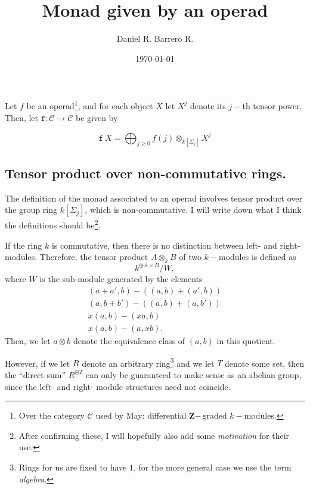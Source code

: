 \documentclass{amsart}
\title{Monad given by an operad}
\author{Daniel R. Barrero R.}
\date{\today}
\begin{document}
\maketitle

\section{}

Let $f$ be an operad\footnote{Over the category $\mathcal{C}$ used by May: differential
$\mathbf{Z}-$graded $k-$modules.}, and for each object $X$ let $X^j$ denote its $j-$th tensor
power. Then, let $\mathtt{f} : \mathcal{C} \to \mathcal{C}$ be given by

$$
\mathtt{f}\ X = \bigoplus_{j \geq 0} f(j) \otimes_{k[\Sigma_j]} X^j
$$

\subsection{Tensor product over non-commutative rings.} The definition of the monad associated to
an operad involves tensor product over the group ring $k[\Sigma_j]$, which is non-commutative.
I will write down what I think the definitions should be\footnote{After confirming these, I will
hopefully also add some \emph{motivation} for their use.}.

\begin{defn}
	If the ring $k$ is commutative, then there is no distinction between left- and right-
	modules. Therefore, the tensor product $A \otimes_k B$ of two $k-$modules is defined as
	$$
	k^{\oplus A \times B}/W,
	$$
	where $W$ is the sub-module generated by the elements
	\begin{eqnarray*}
		(a+a', b) - \left( (a, b) + (a', b) \right) \\
		(a, b+b') - \left( (a, b) + (a, b') \right) \\
		x(a, b) - (xa, b) \\
		x(a, b) - (a, xb).
	\end{eqnarray*}
	Then, we let $a \otimes b$ denote the equivalence class of $(a, b)$ in this quotient.
\end{defn}

However, if we let $R$ denote an arbitrary ring\footnote{Rings for us are fixed to have $1$, for
the more general case we use the term \emph{algebra}.} and we let $T$ denote some set, then the
``direct sum'' $R^{\oplus T}$ can only be guaranteed to make sense as an abelian group, since the
left- and right- module structures need not coincide.
\end{document}
